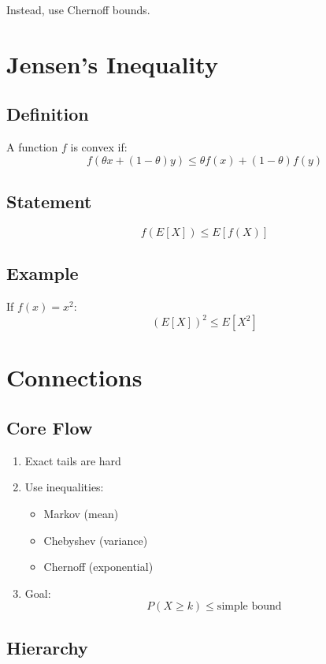 \documentclass[12pt]{article}
\begin{document}
Instead, use Chernoff bounds.

\section{Jensen's Inequality}

\subsection{Definition}

A function $f$ is convex if:
\[
f(\theta x + (1-\theta)y) \le \theta f(x) + (1-\theta)f(y)
\]

\subsection{Statement}

\[
f(E[X]) \le E[f(X)]
\]

\subsection{Example}

If $f(x) = x^2$:
\[
(E[X])^2 \le E[X^2]
\]

\section{Connections}

\subsection{Core Flow}

\begin{enumerate}
    \item Exact tails are hard
    \item Use inequalities:
    \begin{itemize}
        \item Markov (mean)
        \item Chebyshev (variance)
        \item Chernoff (exponential)
    \end{itemize}
    \item Goal:
    \[
    P(X \ge k) \le \text{simple bound}
    \]
\end{enumerate}

\subsection{Hierarchy}
\end{document}
